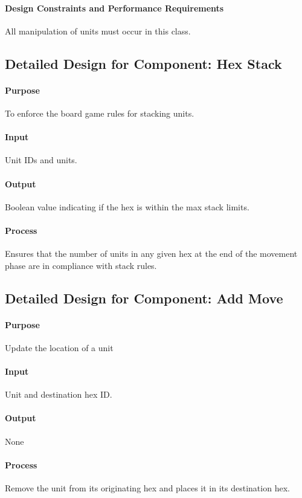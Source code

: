 \documentclass[12pt,a4paper,titlepage]{article}
\begin{document}
\paragraph{Design Constraints and Performance Requirements} All manipulation of units must occur in this class.

\subsection{Detailed Design for Component: Hex Stack}
\paragraph{Purpose} To enforce the board game rules for stacking units.
\paragraph{Input} Unit IDs and units. 
\paragraph{Output} Boolean value indicating if the hex is within the max stack limits.
\paragraph{Process} Ensures that the number of units in any given hex at the end of the movement phase are in compliance with stack rules.

\subsection{Detailed Design for Component: Add Move}
\paragraph{Purpose} Update the location of a unit
\paragraph{Input} Unit and destination hex ID.
\paragraph{Output} None
\paragraph{Process} Remove the unit from its originating hex and places it in its destination hex.
\end{document}

